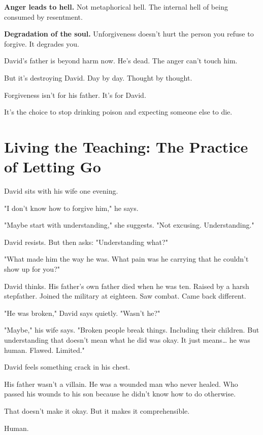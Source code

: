\documentclass[11pt,twoside]{book}
\begin{document}
\textbf{\textbf{Anger leads to hell.}} Not metaphorical hell. The internal hell of being consumed by resentment.

\textbf{\textbf{Degradation of the soul.}} Unforgiveness doesn't hurt the person you refuse to forgive. It degrades you.

David's father is beyond harm now. He's dead. The anger can't touch him.

But it's destroying David. Day by day. Thought by thought.

Forgiveness isn't for his father. It's for David.

It's the choice to stop drinking poison and expecting someone else to die.

\section*{Living the Teaching: The Practice of Letting Go}

David sits with his wife one evening.

"I don't know how to forgive him," he says.

"Maybe start with understanding," she suggests. "Not excusing. Understanding."

David resists. But then asks: "Understanding what?"

"What made him the way he was. What pain was he carrying that he couldn't show up for you?"

David thinks. His father's own father died when he was ten. Raised by a harsh stepfather. Joined the military at eighteen. Saw combat. Came back different.

"He was broken," David says quietly. "Wasn't he?"

"Maybe," his wife says. "Broken people break things. Including their children. But understanding that doesn't mean what he did was okay. It just means\ldots{} he was human. Flawed. Limited."

David feels something crack in his chest.

His father wasn't a villain. He was a wounded man who never healed. Who passed his wounds to his son because he didn't know how to do otherwise.

That doesn't make it okay. But it makes it comprehensible.

Human.
\end{document}
